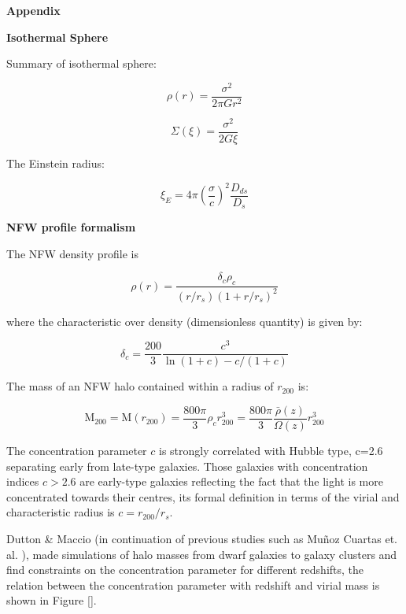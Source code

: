 \begin{appendices}
\textbf{{\Large Appendix}}

\textbf{Isothermal Sphere} 

Summary of isothermal sphere:

\begin{equation}
\rho(r)=\frac{\sigma^2}{2\pi Gr^2}
\end{equation}

\begin{equation}
\Sigma(\xi)=\frac{\sigma^2}{2G\xi}
\end{equation}

The Einstein radius:

\begin{equation}
\xi_{E}=4\pi\left(\frac{\sigma}{c}\right)^{2}\frac{D_{ds}}{D_{s}}
\end{equation} 
 
\textbf{NFW profile formalism}
 
The NFW density profile is 

\begin{equation}
\rho(r)=\frac{\delta_{c}\rho_{c}}{(r/r_{s})(1+r/r_{s})^{2}}
\end{equation}

where the characteristic over density (dimensionless quantity) is given by:

\begin{equation}
\delta_{c}=\frac{200}{3}\frac{c^{3}}{\ln{(1+c)}-c/(1+c)}
\end{equation}

The mass of an NFW halo contained within a radius of $r_{200}$ is:

\begin{equation}
\text{M}_{200}=\text{M}(r_{200})=\frac{800\pi}{3}\rho_{c}r^{3}_{200}=\frac{800\pi}{3}\frac{\bar{\rho}(z)}{\Omega(z)}r^{3}_{200}
\end{equation}

The concentration parameter $c$ is strongly correlated with Hubble type, c=2.6 separating early from late-type galaxies. Those galaxies with concentration indices $c>2.6$ are early-type galaxies reflecting the fact that the light is more concentrated towards their centres, its formal definition in terms of the virial and characteristic radius is $c=r_{200}/r_{s}$.

Dutton \& Maccio \citeyear{Reference23} (in continuation of previous studies such as Mu\~noz Cuartas et. al. \citeyear{Reference12}), made simulations of halo masses from dwarf galaxies to galaxy clusters and find constraints on the concentration parameter for different redshifts, the relation between the concentration parameter with redshift and virial mass is shown in Figure [].


\end{appendices}
